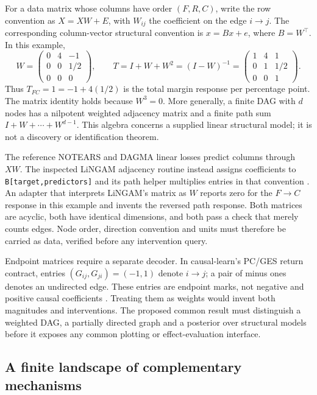 For a data matrix whose columns have order \((F,R,C)\), write the row convention
as \(X=XW+E\), with \(W_{ij}\) the coefficient on the edge \(i\to j\). The
corresponding column-vector structural convention is \(x=Bx+e\), where
\(B=W^\top\). In this example,
\begin{equation}
 W=\begin{pmatrix}0&4&-1\\0&0&1/2\\0&0&0\end{pmatrix},\qquad
 T=I+W+W^2=(I-W)^{-1}
  =\begin{pmatrix}1&4&1\\0&1&1/2\\0&0&1\end{pmatrix}.
\end{equation}
Thus \(T_{FC}=1=-1+4(1/2)\) is the total margin response per percentage point.
The matrix identity holds because \(W^3=0\). More generally, a finite DAG with
\(d\) nodes has a nilpotent weighted adjacency matrix and a finite path sum
\(I+W+\cdots+W^{d-1}\). This algebra concerns a supplied linear structural
model; it is not a discovery or identification theorem.

The reference NOTEARS and DAGMA linear losses predict columns through \(XW\).
The inspected LiNGAM adjacency routine instead assigns coefficients to
\texttt{B[target,predictors]} and its path helper multiplies entries in that
convention \citep{exec13_pydisc_notears,exec13_pydisc_dagma,exec13_pydisc_lingam}.
An adapter that interprets LiNGAM's matrix as \(W\) reports zero for the
\(F\to C\) response in this example and invents the reversed path response.
Both matrices are acyclic, both have identical dimensions, and both pass a
check that merely counts edges. Node order, direction convention and units
must therefore be carried as data, verified before any intervention query.

Endpoint matrices require a separate decoder. In causal-learn's PC/GES return
contract, entries \((G_{ij},G_{ji})=(-1,1)\) denote \(i\to j\); a pair of
minus ones denotes an undirected edge. These entries are endpoint marks, not
negative and positive causal coefficients \citep{exec13_pydisc_causallearn}.
Treating them as weights would invent both magnitudes and interventions. The
proposed common result must distinguish a weighted DAG, a partially directed
graph and a posterior over structural models before it exposes any common
plotting or effect-evaluation interface.

\subsection{A finite landscape of complementary mechanisms}

